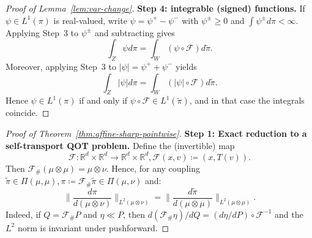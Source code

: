 \documentclass{article}
\theoremstyle{plain}
\theoremstyle{definition}
\theoremstyle{remark}
\numberwithin{equation}{section}
\newcommand{\R}{\mathbb{R}}
\begin{document}
\begin{proof}[Proof of Lemma~\ref{lem:var-change}]
\textbf{Step 4: integrable (signed) functions.}
If $\psi\in L^1(\pi)$ is real-valued, write $\psi=\psi^+-\psi^-$ with $\psi^\pm\ge 0$ and $\int \psi^\pm d\pi<\infty$.
Applying Step~3 to $\psi^\pm$ and subtracting gives
$$
\int_Z\psi d\pi=\int_W(\psi\circ\mathcal F)d\widetilde\pi.
$$
Moreover, applying Step~3 to $|\psi|=\psi^++\psi^-$ yields
$$
\int_Z |\psi|d\pi=\int_W (|\psi|\circ\mathcal F)d\widetilde\pi.
$$
Hence $\psi\in L^1(\pi)$ if and only if $\psi\circ\mathcal F\in L^1(\widetilde\pi)$, and in that case the integrals coincide.
\end{proof}


\begin{proof}[Proof of Theorem~\ref{thm:affine-sharp-pointwise}]
\textbf{Step 1: Exact reduction to a self-transport QOT problem.}
Define the (invertible) map
$$
\mathcal{F}:\R^d\times\R^d\to\R^d\times\R^d,\mathcal{F}(x,v)\coloneqq(x,T(v)).
$$
Then $\mathcal{F}_\#(\mu\otimes\mu)=\mu\otimes\nu$. 
Hence, for any coupling $\widetilde\pi\in\Pi(\mu,\mu),\pi\coloneqq\mathcal{F}_\#\widetilde\pi\in\Pi(\mu,\nu)$ and:
$$
\Big\|\frac{d\pi}{d(\mu\otimes\nu)}\Big\|_{L^2(\mu\otimes\nu)}=\Big\|\frac{d\widetilde\pi}{d(\mu\otimes\mu)}\Big\|_{L^2(\mu\otimes\mu)}.
$$
Indeed, if $Q=\mathcal{F}_\#P$ and $\eta\ll P$, then $d(\mathcal{F}_\#\eta)/dQ=(d\eta/dP)\circ\mathcal{F}^{-1}$ and the $L^2$ norm is invariant under pushforward.


\end{proof}
\end{document}
